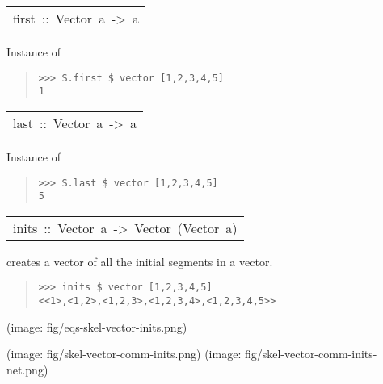 \begin{haddockdesc}
\item[\begin{tabular}{@{}l}
first\ ::\ Vector\ a\ ->\ a
\end{tabular}]\haddockbegindoc
Instance of \par
\begin{quote}
{\haddockverb\begin{verbatim}
>>> S.first $ vector [1,2,3,4,5]
1

\end{verbatim}}
\end{quote}
\end{haddockdesc}
\begin{haddockdesc}
\item[\begin{tabular}{@{}l}
last\ ::\ Vector\ a\ ->\ a
\end{tabular}]\haddockbegindoc
Instance of \par
\begin{quote}
{\haddockverb\begin{verbatim}
>>> S.last $ vector [1,2,3,4,5]
5

\end{verbatim}}
\end{quote}
\end{haddockdesc}
\begin{haddockdesc}
\item[\begin{tabular}{@{}l}
inits\ ::\ Vector\ a\ ->\ Vector\ (Vector\ a)
\end{tabular}]\haddockbegindoc
creates a vector of all the initial segments in a vector.\par
\begin{quote}
{\haddockverb\begin{verbatim}
>>> inits $ vector [1,2,3,4,5]
<<1>,<1,2>,<1,2,3>,<1,2,3,4>,<1,2,3,4,5>>

\end{verbatim}}
\end{quote}(image: fig/eqs-skel-vector-inits.png)\par
           (image: fig/skel-vector-comm-inits.png)
 (image: fig/skel-vector-comm-inits-net.png)\par
           
\end{haddockdesc}
